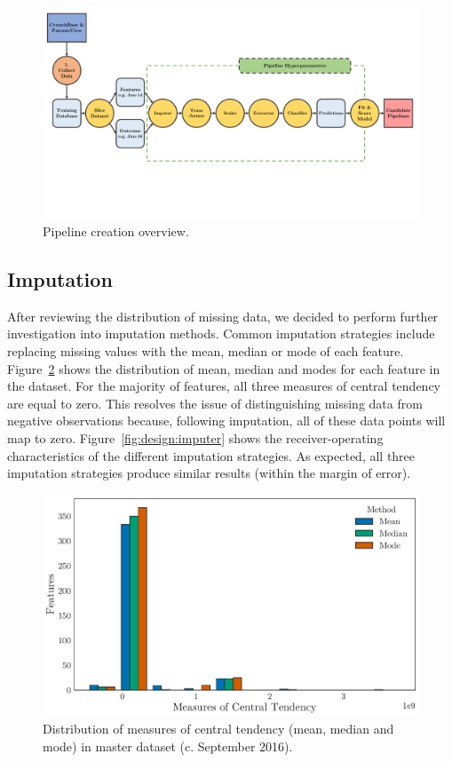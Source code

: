 \documentclass[../thesis/thesis.tex]{subfiles}
\begin{document}
\begin{figure}[!htb]
    \centering
    \includegraphics[width=\textwidth]{../figures/design/flowchart_pipeline_creation}
    \caption[Pipeline creation flowchart]{Pipeline creation overview.}
    \label{fig:design:pipeline_creation}
\end{figure}

\subsection{Imputation}

After reviewing the distribution of missing data, we decided to perform further investigation into imputation methods. Common imputation strategies include replacing missing values with the mean, median or mode of each feature. Figure~\ref{fig:design:central_tendency} shows the distribution of mean, median and modes for each feature in the dataset. For the majority of features, all three measures of central tendency are equal to zero. This resolves the issue of distinguishing missing data from negative observations because, following imputation, all of these data points will map to zero. Figure~\ref{fig:design:imputer} shows the receiver-operating characteristics of the different imputation strategies. As expected, all three imputation strategies produce similar results (within the margin of error).

\begin{figure}[!htb]
    \centering
    \includegraphics[width=\textwidth]{../figures/design/central_tendency}
    \caption[Distribution of central tendency]{Distribution of measures of central tendency (mean, median and mode) in master dataset (c. September 2016).}
    \label{fig:design:central_tendency}
\end{figure}
\end{document}
